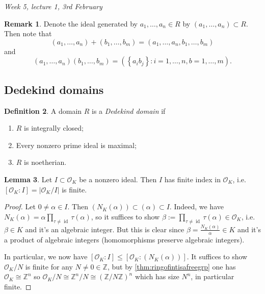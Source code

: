 \documentclass{article}
\newcommand{\Z}{\mathbb{Z}}
\newcommand{\id}{\operatorname{id}}
\newcommand{\ri}{\mathcal{O}}
\theoremstyle{definition}
\newtheorem{defn}{Definition}[subsection]
\newtheorem{lemma}[defn]{Lemma}
\newtheorem{remark}[defn]{Remark}
\begin{document}
\begin{flushright}
\textit{Week 5, lecture 1, 3rd February}
\end{flushright}

\begin{remark}
Denote the ideal generated by $a_1,\ldots,a_n\in R$ by $(a_1,\ldots,a_n)\subset R$. Then note that
\[
(a_1,\ldots,a_n)+(b_1,\ldots,b_m)=(a_1,\ldots,a_n,b_1,\ldots,b_m)
\]
and
\[
(a_1,\ldots,a_n)(b_1,\ldots,b_m)=\left(\left\{a_ib_j\right\}:i=1,\ldots,n,b=1,\ldots,m\right).
\]
\end{remark}

\subsection{Dedekind domains}
\begin{defn}
A domain $R$ is a \textit{Dedekind domain} if
\begin{enumerate}
\item $R$ is integrally closed;
\item Every nonzero prime ideal is maximal;
\item $R$ is noetherian.
\end{enumerate}
\end{defn}

\begin{lemma}
Let $I\subset\ri_K$ be a nonzero ideal. Then $I$ has finite index in $\ri_K$, i.e. $\left[\ri_K:I\right]=\left|\ri_K/I\right|$ is finite.
\end{lemma}
\begin{proof}
Let $0\neq\alpha\in I$. Then $\left(N_K(\alpha)\right)\subset(\alpha)\subset I$. Indeed, we have $N_K(\alpha)=\alpha\prod_{\tau\neq\id}\tau(\alpha)$, so it suffices to show $\beta:=\prod_{\tau\neq\id}\tau(\alpha)\in\ri_K$, i.e. $\beta\in K$ and it's an algebraic integer. But this is clear since $\beta=\frac{N_K(\alpha)}{\alpha}\in K$ and it's a product of algebraic integers (homomorphisms preserve algebraic integers).

In particular, we now have $\left[\ri_K:I\right]\leq \left[\ri_K:(N_K(\alpha))\right]$. It suffices to show $\ri_K/N$ is finite for any $N\neq 0\in\Z$, but by \ref{thm:ringofintisafreegrp} one has $\ri_K\cong\Z^n$ so $\ri_K/N\cong\Z^n/N\cong(\Z/N\Z)^n$ which has size $N^n$, in particular finite.
\end{proof}
\end{document}
